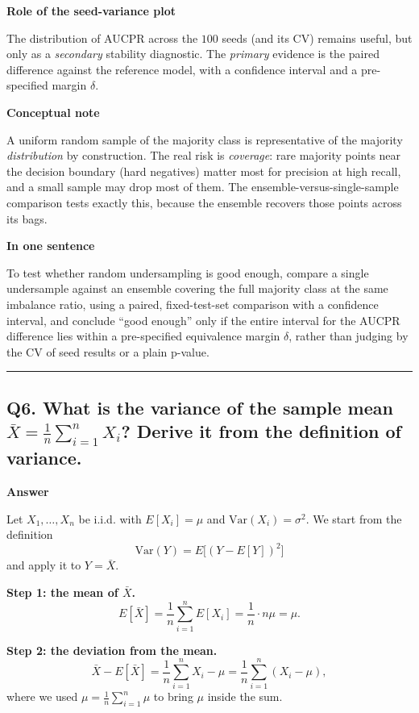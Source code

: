 \documentclass[11pt]{article}
\begin{document}
\textbf{Role of the seed-variance plot}

The distribution of AUCPR across the \(100\) seeds (and its CV) remains useful, but only as a \emph{secondary} stability diagnostic. The \emph{primary} evidence is the paired difference against the reference model, with a confidence interval and a pre-specified margin \(\delta\).

\textbf{Conceptual note}

A uniform random sample of the majority class is representative of the majority \emph{distribution} by construction. The real risk is \emph{coverage}: rare majority points near the decision boundary (hard negatives) matter most for precision at high recall, and a small sample may drop most of them. The ensemble-versus-single-sample comparison tests exactly this, because the ensemble recovers those points across its bags.

\textbf{In one sentence}

To test whether random undersampling is good enough, compare a single undersample against an ensemble covering the full majority class at the same imbalance ratio, using a paired, fixed-test-set comparison with a confidence interval, and conclude ``good enough'' only if the entire interval for the AUCPR difference lies within a pre-specified equivalence margin \(\delta\), rather than judging by the CV of seed results or a plain p-value.

\vspace{5mm}
\hrule
\vspace{5mm}

\subsection*{Q6. What is the variance of the sample mean \(\bar X=\frac{1}{n}\sum_{i=1}^{n}X_i\)? Derive it from the definition of variance.}

\textbf{Answer}

Let \(X_1,\dots,X_n\) be i.i.d. with \(E[X_i]=\mu\) and \(\mathrm{Var}(X_i)=\sigma^2\). We start from the definition
\[
\mathrm{Var}(Y)=E\big[(Y-E[Y])^2\big]
\]
and apply it to \(Y=\bar X\).

\textbf{Step 1: the mean of \(\bar X\).}
\[
E[\bar X]=\frac{1}{n}\sum_{i=1}^{n}E[X_i]=\frac{1}{n}\cdot n\mu=\mu.
\]

\textbf{Step 2: the deviation from the mean.}
\[
\bar X-E[\bar X]
=\frac{1}{n}\sum_{i=1}^{n}X_i-\mu
=\frac{1}{n}\sum_{i=1}^{n}(X_i-\mu),
\]
where we used \(\mu=\frac{1}{n}\sum_{i=1}^{n}\mu\) to bring \(\mu\) inside the sum.
\end{document}
